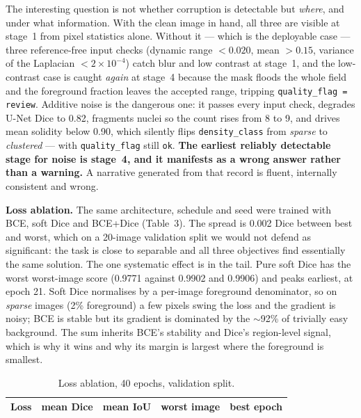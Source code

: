 \documentclass[a4paper,9pt,twocolumn]{extarticle}
\begin{document}
The interesting question is not whether corruption is detectable but
\textit{where}, and under what information. With the clean image in hand, all
three are visible at stage~1 from pixel statistics alone. Without it --- which is
the deployable case --- three reference-free input checks (dynamic range
$<0.020$, mean $>0.15$, variance of the Laplacian $<2\times10^{-4}$) catch blur
and low contrast at stage~1, and the low-contrast case is caught \textit{again}
at stage~4 because the mask floods the whole field and the foreground fraction
leaves the accepted range, tripping \texttt{quality\_flag = review}. Additive
noise is the dangerous one: it passes every input check, degrades U-Net Dice to
0.82, fragments nuclei so the count rises from 8 to 9, and drives mean solidity
below 0.90, which silently flips \texttt{density\_class} from
\textit{sparse} to \textit{clustered} --- with \texttt{quality\_flag} still
\texttt{ok}. \textbf{The earliest reliably detectable stage for noise is
stage~4, and it manifests as a wrong answer rather than a warning.} A narrative
generated from that record is fluent, internally consistent and wrong.

\textbf{Loss ablation.} The same architecture, schedule and seed were trained
with BCE, soft Dice and BCE+Dice (Table~3). The spread is 0.002 Dice between
best and worst, which on a 20-image validation split we would not defend as
significant: the task is close to separable and all three objectives find
essentially the same solution. The one systematic effect is in the tail. Pure
soft Dice has the worst worst-image score (0.9771 against 0.9902 and 0.9906) and
peaks earliest, at epoch 21. Soft Dice normalises by a per-image foreground
denominator, so on \textit{sparse} images (2\% foreground) a few pixels swing
the loss and the gradient is noisy; BCE is stable but its gradient is dominated
by the $\sim$92\% of trivially easy background. The sum inherits BCE's
stability and Dice's region-level signal, which is why it wins and why its
margin is largest where the foreground is smallest.

\begin{table}[t]
\centering\footnotesize
\caption{Loss ablation, 40 epochs, validation split.}
\begin{tabular}{lcccc}
\toprule
Loss & mean Dice & mean IoU & worst image & best epoch\\
\midrule
\bottomrule
\end{tabular}
\end{table}
\end{document}
